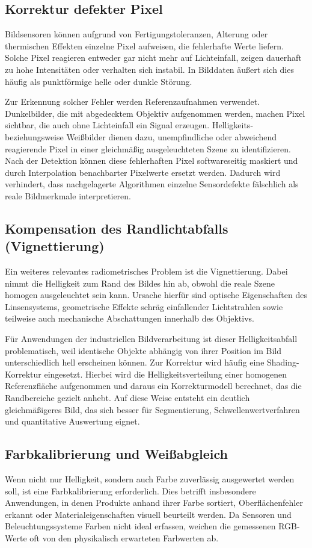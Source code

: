 \documentclass[12pt,a4paper,parskip=half]{scrartcl}
\begin{document}
\subsection{Korrektur defekter Pixel}
Bildsensoren können aufgrund von Fertigungstoleranzen, Alterung oder thermischen Effekten einzelne Pixel aufweisen, die fehlerhafte Werte liefern. Solche Pixel reagieren entweder gar nicht mehr auf Lichteinfall, zeigen dauerhaft zu hohe Intensitäten oder verhalten sich instabil. In Bilddaten äußert sich dies häufig als punktförmige helle oder dunkle Störung.

Zur Erkennung solcher Fehler werden Referenzaufnahmen verwendet. Dunkelbilder, die mit abgedecktem Objektiv aufgenommen werden, machen Pixel sichtbar, die auch ohne Lichteinfall ein Signal erzeugen. Helligkeits- beziehungsweise Weißbilder dienen dazu, unempfindliche oder abweichend reagierende Pixel in einer gleichmäßig ausgeleuchteten Szene zu identifizieren. Nach der Detektion können diese fehlerhaften Pixel softwareseitig maskiert und durch Interpolation benachbarter Pixelwerte ersetzt werden. Dadurch wird verhindert, dass nachgelagerte Algorithmen einzelne Sensordefekte fälschlich als reale Bildmerkmale interpretieren.

\subsection{Kompensation des Randlichtabfalls (Vignettierung)}
Ein weiteres relevantes radiometrisches Problem ist die Vignettierung. Dabei nimmt die Helligkeit zum Rand des Bildes hin ab, obwohl die reale Szene homogen ausgeleuchtet sein kann. Ursache hierfür sind optische Eigenschaften des Linsensystems, geometrische Effekte schräg einfallender Lichtstrahlen sowie teilweise auch mechanische Abschattungen innerhalb des Objektivs.

Für Anwendungen der industriellen Bildverarbeitung ist dieser Helligkeitsabfall problematisch, weil identische Objekte abhängig von ihrer Position im Bild unterschiedlich hell erscheinen können. Zur Korrektur wird häufig eine Shading-Korrektur eingesetzt. Hierbei wird die Helligkeitsverteilung einer homogenen Referenzfläche aufgenommen und daraus ein Korrekturmodell berechnet, das die Randbereiche gezielt anhebt. Auf diese Weise entsteht ein deutlich gleichmäßigeres Bild, das sich besser für Segmentierung, Schwellenwertverfahren und quantitative Auswertung eignet.

\subsection{Farbkalibrierung und Weißabgleich}
Wenn nicht nur Helligkeit, sondern auch Farbe zuverlässig ausgewertet werden soll, ist eine Farbkalibrierung erforderlich. Dies betrifft insbesondere Anwendungen, in denen Produkte anhand ihrer Farbe sortiert, Oberflächenfehler erkannt oder Materialeigenschaften visuell beurteilt werden. Da Sensoren und Beleuchtungssysteme Farben nicht ideal erfassen, weichen die gemessenen RGB-Werte oft von den physikalisch erwarteten Farbwerten ab.
\end{document}
